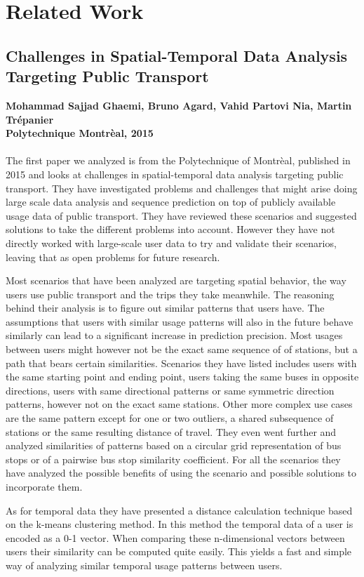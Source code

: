 \newpage
\chapter{Related Work}
\section{Challenges in Spatial-Temporal Data Analysis Targeting Public Transport}
\textbf{Mohammad Sajjad Ghaemi, Bruno Agard, Vahid Partovi Nia, Martin Trépanier\\
Polytechnique Montrèal, 2015}
\\
\\
The first paper we analyzed is from the Polytechnique of Montrèal, published in 2015 and looks at challenges in spatial-temporal data analysis targeting public transport. They have investigated problems and challenges that might arise doing large scale data analysis and sequence prediction on top of publicly available usage data of public transport. They have reviewed these scenarios and suggested solutions to take the different problems into account. However they have not directly worked with large-scale user data to try and validate their scenarios, leaving that as open problems for future research.

Most scenarios that have been analyzed are targeting spatial behavior, the way users use public transport and the trips they take meanwhile. The reasoning behind their analysis is to figure out similar patterns that users have. The assumptions that users with similar usage patterns will also in the future behave similarly can lead to a significant increase in prediction precision. Most usages between users might however not be the exact same sequence of of stations, but a path that bears certain similarities. Scenarios they have listed includes users with the same starting point and ending point, users taking the same buses in opposite directions, users with same directional patterns or same symmetric direction patterns, however not on the exact same stations. Other more complex use cases are the same pattern except for one or two outliers, a shared subsequence of stations or the same resulting distance of travel. They even went further and analyzed similarities of patterns based on a circular grid representation of bus stops or of a pairwise bus stop similarity coefficient. For all the scenarios they have analyzed the possible benefits of using the scenario and possible solutions to incorporate them.

As for temporal data they have presented a distance calculation technique based on the k-means clustering method. In this method the temporal data of a user is encoded as a 0-1 vector. When comparing these n-dimensional vectors between users their similarity can be computed quite easily. This yields a fast and simple way of analyzing similar temporal usage patterns between users.


